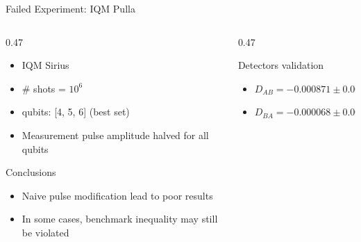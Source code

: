 \documentclass{beamer}
\begin{document}
	\begin{frame}{Failed Experiment: IQM Pulla}
		
		\begin{columns}
			
			\begin{column}{0.47\textwidth}
				
				\begin{itemize}

					\item IQM Sirius
					
					\item \# shots = $10^6$
					
					\item qubits: [4, 5, 6] (best set)
					
					\item Measurement pulse amplitude halved for all qubits
										
				\end{itemize}
		
				\begin{alertblock}{Conclusions}
					\begin{itemize}
						
						\item Naive pulse modification lead to poor results
						
						\item In some cases, benchmark inequality may still
						be violated
						
					\end{itemize}
				\end{alertblock}
				
			\end{column}
		
			\begin{column}{0.47\textwidth}
				
				\begin{block}{Detectors validation}
					
					\begin{itemize}

						\item $D_{AB} = -0.000871 \pm 0.005872$
						
						\item $D_{BA} = -0.000068 \pm 0.005807$

					\end{itemize}
					
				\end{block} 
				

\end{column}
\end{columns}
\end{frame}
\end{document}
